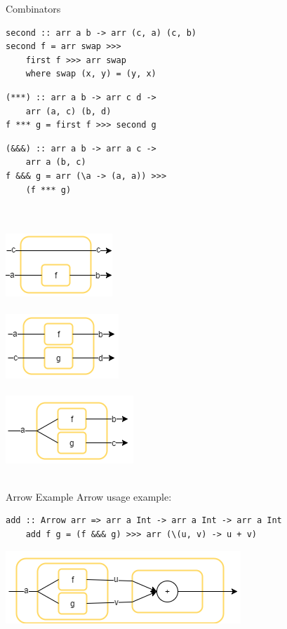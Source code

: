 \begin{frame}[fragile]{Combinators}
\begin{minipage}{0.6\textwidth}
\begin{lstlisting}[frame=htrbl]
second :: arr a b -> arr (c, a) (c, b)
second f = arr swap >>>
	first f >>> arr swap
	where swap (x, y) = (y, x)
\end{lstlisting}
\begin{lstlisting}[frame=htrbl]
(***) :: arr a b -> arr c d ->
	arr (a, c) (b, d)
f *** g = first f >>> second g
\end{lstlisting}
\begin{lstlisting}[frame=htrbl]
(&&&) :: arr a b -> arr a c ->
	arr a (b, c)
f &&& g = arr (\a -> (a, a)) >>> 
	(f *** g)
\end{lstlisting}
	\vfill
\end{minipage}
\hspace*{0.03\textwidth}
\begin{minipage}{0.25\textwidth}
	~\\~\\
	\includegraphics[scale=0.6]{images/second}~\\~\\
	\includegraphics[scale=0.6]{images/starstarstar}~\\~\\
	\includegraphics[scale=0.6]{images/dollardollardollar}~\\~\\
\end{minipage}
\end{frame}

\begin{frame}[fragile]{Arrow Example}
	Arrow usage example:
	\begin{lstlisting}[frame=htrbl]
	add :: Arrow arr => arr a Int -> arr a Int -> arr a Int
	add f g = (f &&& g) >>> arr (\(u, v) -> u + v)
	\end{lstlisting}
	\begin{center}
		\includegraphics[scale=0.6]{images/addA-comb}
	\end{center}
\end{frame}